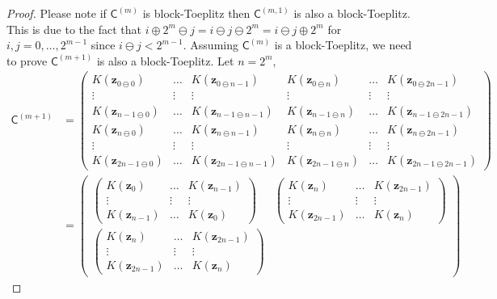 \documentclass{iitthesis}          %
\newcommand{\bm}[1]{\boldsymbol{#1}}
\newcommand{\vz}{\bm{z}}
\newcommand{\mC}{\mathsf{C}}
\begin{document}
\begin{proof}
Please note if $\mC^{(m)}$ is block-Toeplitz then $\mC^{(m,1)}$ is also a block-Toeplitz. 
This is due to the fact that $ i \oplus 2^m \ominus j = i \ominus j \ominus 2^m = i \ominus j \oplus 2^m $ for $i,j=0,\dots,2^{m-1}$ since $i \ominus j < 2^{m-1}$.
Assuming $\mC^{(m)}$ is a block-Toeplitz, we need to prove $\mC^{(m+1)}$ is also a block-Toeplitz. Let $n=2^m$,
\begin{align*}
\mC^{(m+1)} &= 
\begin{pmatrix}
K(\vz_{0    \ominus 0}) & \hdots & K(\vz_{0    \ominus n-1}) & K(\vz_{0    \ominus n}) & \hdots & K(\vz_{0    \ominus 2n-1}) \\
\vdots             & \vdots &             \vdots          &           \vdots      & \vdots &             \vdots         \\
K(\vz_{n-1  \ominus 0}) & \hdots & K(\vz_{n-1  \ominus n-1}) & K(\vz_{n-1  \ominus n}) & \hdots & K(\vz_{n-1  \ominus 2n-1}) \\
K(\vz_{n    \ominus 0}) & \hdots & K(\vz_{n    \ominus n-1}) & K(\vz_{n    \ominus n}) & \hdots & K(\vz_{n    \ominus 2n-1}) \\
\vdots      & \vdots &             \vdots        &             \vdots      & \vdots &             \vdots         \\
K(\vz_{2n-1 \ominus 0}) & \hdots & K(\vz_{2n-1 \ominus n-1}) & K(\vz_{2n-1 \ominus n}) & \hdots & K(\vz_{2n-1 \ominus 2n-1}) 
\end{pmatrix} 
\\
& = 
\begin{pmatrix}
\begin{pmatrix}
K(\vz_{  0   }) & \hdots & K(\vz_{ n-1}) \\
\vdots          & \vdots &    \vdots     \\
K(\vz_{ n-1  }) & \hdots & K(\vz_{ 0 })
\end{pmatrix}
& 
\begin{pmatrix}
K(\vz_{ n})     & \hdots & K(\vz_{ 2n-1}) \\
\vdots          & \vdots &     \vdots     \\
K(\vz_{ 2n-1 }) & \hdots & K(\vz_{ n })   
\end{pmatrix}
\\
\begin{pmatrix}
K(\vz_{ n})     & \hdots & K(\vz_{ 2n-1}) \\
\vdots          & \vdots &     \vdots     \\
K(\vz_{ 2n-1 }) & \hdots & K(\vz_{ n })   
\end{pmatrix}

\end{pmatrix}
\end{align*}
\end{proof}
\end{document}
